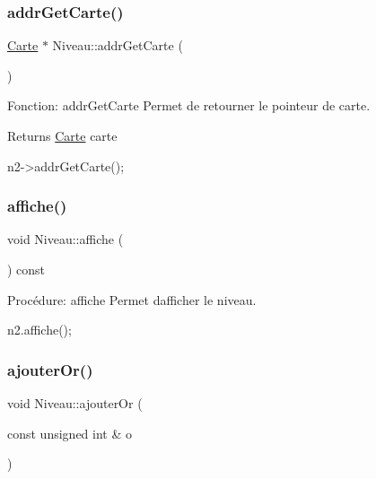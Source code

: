 \subsubsection{\texorpdfstring{addr\+Get\+Carte()}{addrGetCarte()}}
{\footnotesize\ttfamily \hyperlink{classCarte}{Carte} $\ast$ Niveau\+::addr\+Get\+Carte (\begin{DoxyParamCaption}{ }\end{DoxyParamCaption})}



Fonction\+: addr\+Get\+Carte Permet de retourner le pointeur de carte. 

\begin{DoxyReturn}{Returns}
\hyperlink{classCarte}{Carte} carte 
\begin{DoxyCode}
n2->addrGetCarte();
\end{DoxyCode}
 
\end{DoxyReturn}
\mbox{\label{classNiveau_ac0aff25fcdea980ff740344f58be0bbc}} 
\subsubsection{\texorpdfstring{affiche()}{affiche()}}
{\footnotesize\ttfamily void Niveau\+::affiche (\begin{DoxyParamCaption}{ }\end{DoxyParamCaption}) const}



Procédure\+: affiche Permet d\textquotesingle{}afficher le niveau. 


\begin{DoxyCode}
n2.affiche();
\end{DoxyCode}
 \mbox{\label{classNiveau_adf4df9af322f4354ca4a9adeffd5eb29}} 
\subsubsection{\texorpdfstring{ajouter\+Or()}{ajouterOr()}}
{\footnotesize\ttfamily void Niveau\+::ajouter\+Or (\begin{DoxyParamCaption}\item[{const unsigned int \&}]{o }\end{DoxyParamCaption})}



